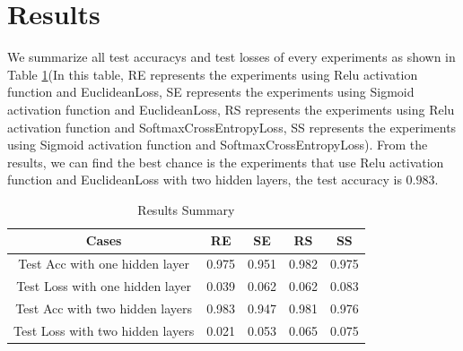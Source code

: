 \documentclass{elegantbook}
\begin{document}
\section{Results}
We summarize all test accuracys and test losses of every experiments as shown in Table \ref{tab3}(In this table, RE represents the experiments using Relu activation function and EuclideanLoss, SE represents the experiments using Sigmoid activation function and EuclideanLoss, RS represents the experiments using Relu activation function and SoftmaxCrossEntropyLoss, SS represents the experiments using Sigmoid activation function and SoftmaxCrossEntropyLoss). From the results, we can find the best chance is the experiments that use Relu activation function and EuclideanLoss with two hidden layers, the test accuracy is $0.983$.

\begin{table}[!ht]
	\centering
	\caption{\label{tab3}Results Summary}
	\begin{tabular}{|c|c|c|c|c|}
		\hline
		Cases & RE & SE & RS & SS \\
		\hline
		Test Acc with one hidden layer & 0.975 & 0.951 & 0.982 & 0.975 \\
		\hline
		Test Loss with one hidden layer & 0.039 & 0.062 & 0.062 & 0.083 \\
		\hline
		Test Acc with two hidden layers & {\color{red} 0.983} & 0.947 & 0.981 & 0.976 \\
		\hline
		Test Loss with two hidden layers & {\color{green} 0.021} & 0.053 & 0.065 & 0.075 \\
		\hline
	\end{tabular}
\end{table}
\end{document}
